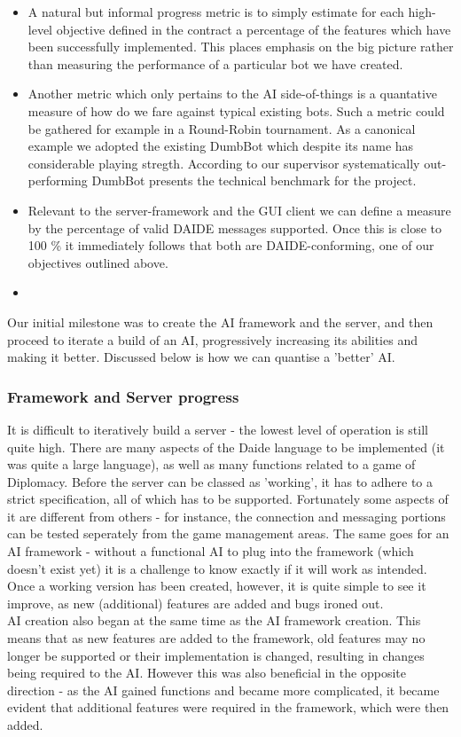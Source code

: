 \documentclass[11pt]{article}
\begin{document}
\begin{itemize}

\item A natural but informal progress metric is to simply estimate for
      each high-level objective defined in the contract a percentage of the
      features which have been successfully implemented. This places emphasis
      on the big picture rather than measuring the performance of a particular
      bot we have created.
\item Another metric which only pertains to the AI side-of-things is a
      quantative measure of how do we fare against typical existing bots. Such a
      metric could be gathered for example in a Round-Robin tournament. 
      As a canonical example we adopted the existing DumbBot which despite its
      name has considerable playing stregth. According to our supervisor
      systematically out-performing DumbBot presents the technical benchmark 
      for the project.
\item Relevant to the server-framework and the GUI client we can define a 
      measure by the percentage of valid DAIDE messages supported. Once this
      is close to 100 \% it immediately follows that both are DAIDE-conforming,
      one of our objectives outlined above.
\item 

\end{itemize}

 Our 
initial milestone was to create the AI framework and the server, and then 
proceed to iterate a build of an AI, progressively increasing its abilities and
making it better. Discussed below is how we can quantise a 'better' AI.

\subsubsection{Framework and Server progress}
It is difficult to iteratively build a server - the lowest level of operation is
still quite high. There are many aspects of the Daide language to be implemented
(it was quite a large language), as well as many functions related to a game of
Diplomacy. Before the server can be classed as 'working', it has to adhere to a
strict specification, all of which has to be supported. Fortunately some aspects
of it are different from others - for instance, the connection and messaging 
portions can be tested seperately from the game management areas. The same goes
for an AI framework - without a functional AI to plug into the framework (which 
doesn't exist yet) it is a challenge to know exactly if it will work as intended.
Once a working version has been created, however, it is quite simple to see it
improve, as new (additional) features are added and bugs ironed out.
\\
AI creation also began at the same time as the AI framework creation. This means
that as new features are added to the framework, old features may no longer be
supported or their implementation is changed, resulting in changes being 
required to the AI. However this was also beneficial in the opposite direction
- as the AI gained functions and became more complicated, it became evident that
additional features were required in the framework, which were then added.
\end{document}
